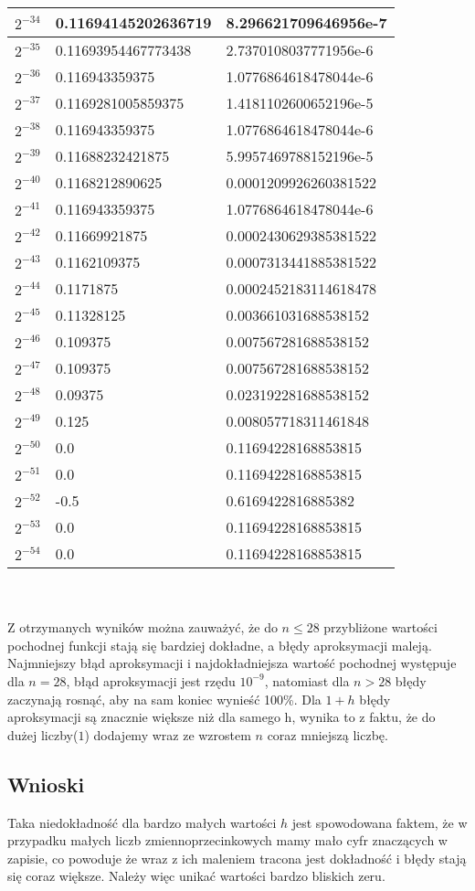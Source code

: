 \documentclass[11pt]{article}
\begin{document}
\begin{tabularx}{\textwidth}{|l|X|X|}
\hline
$2^{-34}$ & 0.11694145202636719 & 8.296621709646956e-7 \\
\hline
$2^{-35}$ & 0.11693954467773438 & 2.7370108037771956e-6 \\
\hline
$2^{-36}$ & 0.116943359375 & 1.0776864618478044e-6 \\
\hline
$2^{-37}$ & 0.1169281005859375 & 1.4181102600652196e-5 \\
\hline
$2^{-38}$ & 0.116943359375 & 1.0776864618478044e-6 \\
\hline
$2^{-39}$ & 0.11688232421875 & 5.9957469788152196e-5 \\
\hline
$2^{-40}$ & 0.1168212890625 & 0.0001209926260381522 \\
\hline
$2^{-41}$ & 0.116943359375 & 1.0776864618478044e-6 \\
\hline
$2^{-42}$ & 0.11669921875 & 0.0002430629385381522 \\
\hline
$2^{-43}$ & 0.1162109375 & 0.0007313441885381522 \\
\hline
$2^{-44}$ & 0.1171875 & 0.0002452183114618478 \\
\hline
$2^{-45}$ & 0.11328125 & 0.003661031688538152 \\
\hline
$2^{-46}$ & 0.109375 & 0.007567281688538152 \\
\hline
$2^{-47}$ & 0.109375 & 0.007567281688538152 \\
\hline
$2^{-48}$ & 0.09375 & 0.023192281688538152 \\
\hline
$2^{-49}$ & 0.125 & 0.008057718311461848 \\
\hline
$2^{-50}$ & 0.0 & 0.11694228168853815 \\
\hline
$2^{-51}$ & 0.0 & 0.11694228168853815 \\
\hline
$2^{-52}$ & -0.5 & 0.6169422816885382 \\
\hline
$2^{-53}$ & 0.0 & 0.11694228168853815 \\
\hline
$2^{-54}$ & 0.0 & 0.11694228168853815 \\
\hline
\end{tabularx} \\
\vspace{25pt} \\
Z otrzymanych wyników można zauważyć, że do $n\leq28$ przybliżone wartości pochodnej funkcji stają się bardziej dokładne, a błędy aproksymacji maleją. Najmniejszy błąd aproksymacji i najdokładniejsza wartość pochodnej występuje dla $n=28$, błąd aproksymacji jest rzędu $10^{-9}$, natomiast dla $n>28$ błędy zaczynają rosnąć, aby na sam koniec wynieść 100\%. Dla $1+h$ błędy aproksymacji są znacznie większe niż dla samego h, wynika to z faktu, że do dużej liczby($1$) dodajemy wraz ze wzrostem $n$ coraz mniejszą liczbę.
\subsection{Wnioski}
Taka niedokładność dla bardzo małych wartości $h$ jest spowodowana faktem, że w przypadku małych liczb zmiennoprzecinkowych mamy mało cyfr znaczących w zapisie, co powoduje że wraz z ich maleniem tracona jest dokładność i błędy stają się coraz większe. Należy więc unikać wartości bardzo bliskich zeru.
\end{document}
